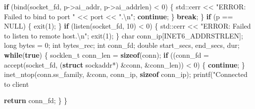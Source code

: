 \documentclass[]{article}
\newenvironment{Shaded}{}{}
\newcommand{\AttributeTok}[1]{\textcolor[rgb]{0.49,0.56,0.16}{#1}}
\newcommand{\BuiltInTok}[1]{#1}
\newcommand{\ControlFlowTok}[1]{\textcolor[rgb]{0.00,0.44,0.13}{\textbf{#1}}}
\newcommand{\DataTypeTok}[1]{\textcolor[rgb]{0.56,0.13,0.00}{#1}}
\newcommand{\DecValTok}[1]{\textcolor[rgb]{0.25,0.63,0.44}{#1}}
\newcommand{\KeywordTok}[1]{\textcolor[rgb]{0.00,0.44,0.13}{\textbf{#1}}}
\newcommand{\NormalTok}[1]{#1}
\newcommand{\SpecialCharTok}[1]{\textcolor[rgb]{0.25,0.44,0.63}{#1}}
\newcommand{\StringTok}[1]{\textcolor[rgb]{0.25,0.44,0.63}{#1}}
\begin{document}
\begin{Shaded}
\begin{Highlighting}[]
        \ControlFlowTok{if}\NormalTok{ (bind(socket_fd, p->ai_addr, p->ai_addrlen) < }\DecValTok{0}\NormalTok{) \{}
            \BuiltInTok{std::}\NormalTok{cerr << }\StringTok{"ERROR: Failed to bind to port "}\NormalTok{ << port << }\StringTok{".}\SpecialCharTok{\textbackslash{}n}\StringTok{"}\NormalTok{;}
            \ControlFlowTok{continue}\NormalTok{;}
\NormalTok{        \}}
        \ControlFlowTok{break}\NormalTok{;}
\NormalTok{    \}}
    \ControlFlowTok{if}\NormalTok{ (p == NULL) \{}
\NormalTok{        exit(}\DecValTok{1}\NormalTok{);}
\NormalTok{    \}}
    \ControlFlowTok{if}\NormalTok{ (listen(socket_fd, }\DecValTok{10}\NormalTok{) < }\DecValTok{0}\NormalTok{) \{}
        \BuiltInTok{std::}\NormalTok{cerr << }\StringTok{"ERROR: Failed to listen to remote host.}\SpecialCharTok{\textbackslash{}n}\StringTok{"}\NormalTok{;}
\NormalTok{        exit(}\DecValTok{1}\NormalTok{);}
\NormalTok{    \}}
    \DataTypeTok{char}\NormalTok{ conn_ip[INET6_ADDRSTRLEN];}
    \DataTypeTok{long}\NormalTok{ bytes = }\DecValTok{0}\NormalTok{;}
    \DataTypeTok{int}\NormalTok{ bytes_rec;}
    \DataTypeTok{int}\NormalTok{ conn_fd;}
    \DataTypeTok{double}\NormalTok{ start_secs, end_secs, dur;}
    \ControlFlowTok{while}\NormalTok{(}\KeywordTok{true}\NormalTok{) \{}
        \DataTypeTok{socklen_t}\NormalTok{ conn_len = }\KeywordTok{sizeof}\NormalTok{(conn);}
        \ControlFlowTok{if}\NormalTok{ ((conn_fd = accept(socket_fd, (}\KeywordTok{struct}\NormalTok{ sockaddr*) &conn, &conn_len)) < }\DecValTok{0}\NormalTok{) \{}
            \ControlFlowTok{continue}\NormalTok{;}
\NormalTok{        \}}
\NormalTok{        inet_ntop(conn.ss_family, &conn, conn_ip, }\KeywordTok{sizeof}\NormalTok{ conn_ip);}
\NormalTok{        printf(}\StringTok{"Connected to client }\SpecialCharTok{%s}\StringTok{ through port }\SpecialCharTok{%s}\StringTok{.}\SpecialCharTok{\textbackslash{}n}\StringTok{"}\NormalTok{, (}\AttributeTok{const} \DataTypeTok{char}\NormalTok{*)conn_ip, (}\DataTypeTok{char}\NormalTok{*)port.c_str());     }
        \ControlFlowTok{return}\NormalTok{ conn_fd;}
\NormalTok{    \}}
\NormalTok{\}}


}
\end{Highlighting}
\end{Shaded}
\end{document}
